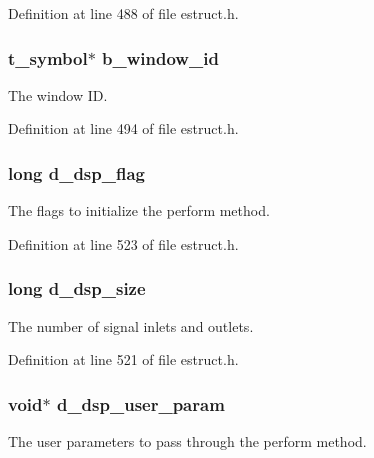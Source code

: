 Definition at line 488 of file estruct.\-h.

\hypertarget{struct__edspbox_a7033df943e798c68e3a6117785c2d79e}{
\subsubsection[{b\-\_\-window\-\_\-id}]{\setlength{\rightskip}{0pt plus 5cm}t\-\_\-symbol$\ast$ b\-\_\-window\-\_\-id}}\label{struct__edspbox_a7033df943e798c68e3a6117785c2d79e}
The window I\-D. 

Definition at line 494 of file estruct.\-h.

\hypertarget{struct__edspbox_af3409f354253e5753dbba6b22472972e}{
\subsubsection[{d\-\_\-dsp\-\_\-flag}]{\setlength{\rightskip}{0pt plus 5cm}long d\-\_\-dsp\-\_\-flag}}\label{struct__edspbox_af3409f354253e5753dbba6b22472972e}
The flags to initialize the perform method. 

Definition at line 523 of file estruct.\-h.

\hypertarget{struct__edspbox_a0bb016ebe02ce3d3a0965a19c1d8476d}{
\subsubsection[{d\-\_\-dsp\-\_\-size}]{\setlength{\rightskip}{0pt plus 5cm}long d\-\_\-dsp\-\_\-size}}\label{struct__edspbox_a0bb016ebe02ce3d3a0965a19c1d8476d}
The number of signal inlets and outlets. 

Definition at line 521 of file estruct.\-h.

\hypertarget{struct__edspbox_ab056760f93f95b4edc3a8dddd0b5b62f}{
\subsubsection[{d\-\_\-dsp\-\_\-user\-\_\-param}]{\setlength{\rightskip}{0pt plus 5cm}void$\ast$ d\-\_\-dsp\-\_\-user\-\_\-param}}\label{struct__edspbox_ab056760f93f95b4edc3a8dddd0b5b62f}
The user parameters to pass through the perform method. 

